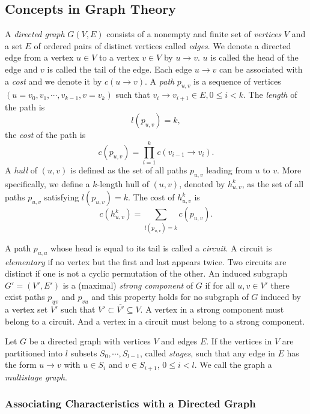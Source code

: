 \subsection{Concepts in Graph Theory} \label{sec:graph-concept}

A \textit{directed graph} $G(V, E)$ consists of a nonempty and finite set of \textit{vertices} $V$ and a set $E$ of ordered pairs of distinct vertices called \textit{edges}. We denote a directed edge from a vertex $u\in V$ to a vertex $v\in V$ by $u\rightarrow v$. $u$ is called the head of the edge and $v$ is called the tail of the edge. Each edge $u\rightarrow v$ can be associated with a \textit{cost} and we denote it by $c(u\rightarrow v)$. A \textit{path} $p_{u,v}$ is a sequence of vertices $(u=v_0,v_1,\cdots,v_{k-1},v=v_k)$ such that $v_i\rightarrow v_{i+1}\in E, 0\leq i<k$. The \textit{length} of the path is
\[
    l(p_{u,v})=k,
\]
the \textit{cost} of the path is
\[
    c(p_{u,v})=\prod\limits_{i=1}^{k}c(v_{i-1}\rightarrow v_i).
\]
A \textit{hull} of $(u,v)$ is defined as the set of all paths $p_{u,v}$ leading from $u$ to $v$. More specifically, we define a $k$-length hull of $(u,v)$, denoted by $h^k_{u,v}$, as the set of all paths $p_{u,v}$ satisfying $l(p_{u,v})=k$. The cost of $h^k_{u,v}$ is
\[
    c(h^k_{u,v})=\sum\limits_{l(p_{u,v})=k} c(p_{u,v}).
\]

A path $p_{u,u}$ whose head is equal to its tail is called a \textit{circuit}. A circuit is \textit{elementary} if no vertex but the first and last appears twice. Two circuits are distinct if one is not a cyclic permutation of the other. An induced subgraph $G'=(V',E')$ is a (maximal) \textit{strong component} of $G$ if for all $u, v\in V'$ there exist paths $p_{uv}$ and $p_{vu}$ and this property holds for no subgraph of $G$ induced by a vertex set $\overline{V'}$ such that $V' \subset \overline{V'} \subseteq V$. A vertex in a strong component must belong to a circuit. And a vertex in a circuit must belong to a strong component. 

Let $G$ be a directed graph with vertices $V$ and edges $E$. If the vertices in $V$ are partitioned into $l$ subsets $S_0,\cdots,S_{l-1}$, called \textit{stages}, such that any edge in $E$ has the form $u\rightarrow v$ with $u\in S_i$ and $v\in S_{i+1}$, $0\leq i<l$. We call the graph a \textit{multistage graph}.

\subsubsection{Associating Characteristics with a Directed Graph}


